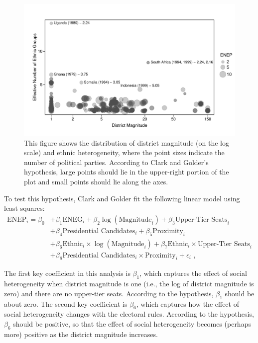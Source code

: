 \documentclass[12pt]{article}
\begin{document}
\begin{figure}[h!]
\begin{center}
\includegraphics[scale = 0.8]{figs/cg-scatter.pdf}
\caption{This figure shows the distribution of district magnitude (on the log scale) and ethnic heterogeneity, where the point sizes indicate the number of political parties. 
According to Clark and Golder's hypothesis, large points should lie in the upper-right portion of the plot and small points should lie along the axes.}\label{fig:cg-scatter}
\end{center}
\end{figure}

To test this hypothesis, Clark and Golder fit the following linear model using least squares:
\begin{align*}
\text{ENEP}_i = \beta_0 &+ \beta_1 \text{ENEG}_i + \beta_2 \log(\text{Magnitude}_i) + \beta_3 \text{Upper-Tier Seats}_i\\
                                                     &+\beta_4 \text{Presidential Candidates}_i + \beta_5 \text{Proximity}_i\\
                                                     &+ \beta_6 \text{Ethnic}_i \times \log (\text{Magnitude}_i) + \beta_7 \text{Ethnic}_i \times \text{Upper-Tier Seats}_i\\
                                                     &+ \beta_8 \text{Presidential Candidates}_i \times \text{Proximity}_i + \epsilon_i\text{ ,}
\end{align*}

The first key coefficient in this analysis is $\beta_1$, which captures the effect of social heterogeneity when district magnitude is one (i.e., the log of district magnitude is zero) and there are no upper-tier seats. 
According to the hypothesis, $\beta_1$ should be about zero. 
The second key coefficient is $\beta_6$, which captures how the effect of social heterogeneity changes with the electoral rules. 
According to the hypothesis, $\beta_6$ should be positive, so that the effect of social heterogeneity becomes (perhaps more) positive as the district magnitude increases.
\end{document}
